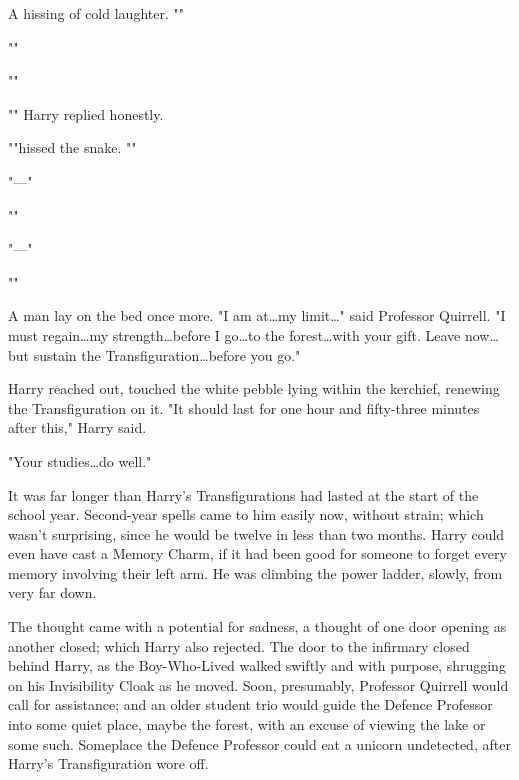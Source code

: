 A hissing of cold laughter. ""

""

""

"" Harry replied honestly.

""hissed the snake. ""

"—"

""

"—"

""

A man lay on the bed once more. "I am at…my limit…" said
Professor Quirrell. "I must regain…my strength…before I
go…to the forest…with your gift. Leave now…but sustain
the Transfiguration…before you go."

Harry reached out, touched the white pebble lying within the kerchief, renewing
the Transfiguration on it. "It should last for one hour and fifty-three minutes
after this," Harry said.

"Your studies…do well."

It was far longer than Harry's Transfigurations had lasted at the start of the
school year. Second-year spells came to him easily now, without strain; which
wasn't surprising, since he would be twelve in less than two months. Harry
could even have cast a Memory Charm, if it had been good for someone to forget
every memory involving their left arm. He was climbing the power ladder,
slowly, from very far down.

The thought came with a potential for sadness, a thought of one door opening as
another closed; which Harry also rejected.
\later
The door to the infirmary closed behind Harry, as the Boy-Who-Lived walked
swiftly and with purpose, shrugging on his Invisibility Cloak as he moved.
Soon, presumably, Professor Quirrell would call for assistance; and an older
student trio would guide the Defence Professor into some quiet place, maybe the
forest, with an excuse of viewing the lake or some such. Someplace the Defence
Professor could eat a unicorn undetected, after Harry's Transfiguration wore
off.

